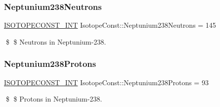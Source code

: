 \subsubsection{\texorpdfstring{Neptunium238\+Neutrons}{Neptunium238Neutrons}}
{\footnotesize\ttfamily \mbox{\hyperlink{group___isotope_const-_macros_ga5f18360b3e99483a35c32d789e62621c}{I\+S\+O\+T\+O\+P\+E\+C\+O\+N\+S\+T\+\_\+\+I\+NT}} Isotope\+Const\+::\+Neptunium238\+Neutrons = 145}

\$ \$ Neutrons in Neptunium-\/238. \mbox{\label{group___isotope_const-_neptunium-_np238_ga4f72f4ed51b689605e3b8834ca45151d}} 
\subsubsection{\texorpdfstring{Neptunium238\+Protons}{Neptunium238Protons}}
{\footnotesize\ttfamily \mbox{\hyperlink{group___isotope_const-_macros_ga5f18360b3e99483a35c32d789e62621c}{I\+S\+O\+T\+O\+P\+E\+C\+O\+N\+S\+T\+\_\+\+I\+NT}} Isotope\+Const\+::\+Neptunium238\+Protons = 93}

\$ \$ Protons in Neptunium-\/238. 